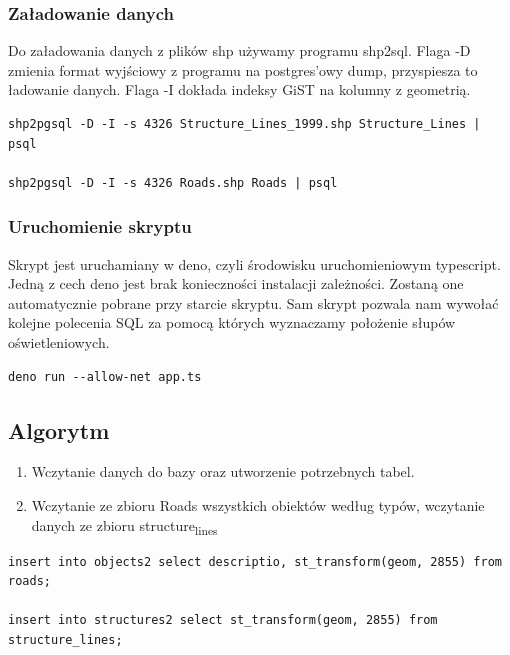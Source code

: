 \documentclass[11pt]{article}
\begin{document}
\subsubsection{Załadowanie danych}
\label{sec:org1a3c12c}

Do załadowania danych z plików shp używamy programu shp2sql. Flaga -D zmienia format wyjściowy z programu na postgres'owy dump, przyspiesza to ładowanie danych. Flaga -I dokłada indeksy GiST na kolumny z geometrią.

\begin{verbatim}
shp2pgsql -D -I -s 4326 Structure_Lines_1999.shp Structure_Lines | psql 

shp2pgsql -D -I -s 4326 Roads.shp Roads | psql 
\end{verbatim}

\subsubsection{Uruchomienie skryptu}
\label{sec:org3893847}

Skrypt jest uruchamiany w deno, czyli środowisku uruchomieniowym typescript. Jedną z cech deno jest brak konieczności instalacji zależności. Zostaną one automatycznie pobrane przy starcie skryptu. Sam skrypt pozwala nam wywołać kolejne polecenia SQL za pomocą których wyznaczamy położenie słupów oświetleniowych.

\begin{verbatim}
deno run --allow-net app.ts 
\end{verbatim}

\subsection{Algorytm}
\label{sec:orge206f0d}

\begin{enumerate}
\item Wczytanie danych do bazy oraz utworzenie potrzebnych tabel.
\item Wczytanie ze zbioru Roads wszystkich obiektów według typów, wczytanie danych ze zbioru structure\textsubscript{lines}
\end{enumerate}

\begin{verbatim}
insert into objects2 select descriptio, st_transform(geom, 2855) from roads;

insert into structures2 select st_transform(geom, 2855) from structure_lines;
\end{verbatim}
\end{document}
